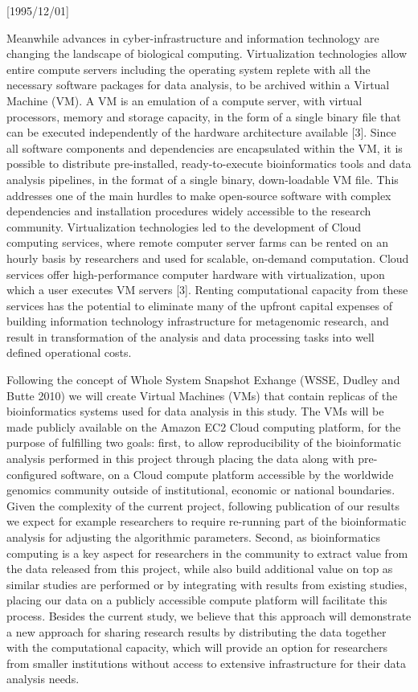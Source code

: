 \NeedsTeXFormat{LaTeX2e}[1995/12/01] \documentclass[10pt]{bmc_article}
\newenvironment{bmcformat}{\begin{raggedright}\baselineskip20pt\sloppy\setboolean{publ}{false}}{\end{raggedright}\baselineskip20pt\sloppy}
\begin{document}
\begin{bmcformat}
Meanwhile advances in cyber-infrastructure and information technology are changing the landscape of biological
computing. Virtualization technologies allow entire compute servers including the operating system replete
with all the necessary software packages for data analysis, to be archived within a Virtual Machine (VM). A VM
is an emulation of a compute server, with virtual processors, memory and storage capacity, in the form of a
single binary file that can be executed independently of the hardware architecture available [3]. Since all
software components and dependencies are encapsulated within the VM, it is possible to distribute
pre-installed, ready-to-execute bioinformatics tools and data analysis pipelines, in the format of a single
binary, down-loadable VM file. This addresses one of the main hurdles to make open-source software with
complex dependencies and installation procedures widely accessible to the research community.  Virtualization
technologies led to the development of Cloud computing services, where remote computer server farms can be
rented on an hourly basis by researchers and used for scalable, on-demand computation. Cloud services offer
high-performance computer hardware with virtualization, upon which a user executes VM servers [3]. Renting
computational capacity from these services has the potential to eliminate many of the upfront capital expenses
of building information technology infrastructure for metagenomic research, and result in transformation of
the analysis and data processing tasks into well defined operational costs. 

Following the concept of Whole System Snapshot Exhange (WSSE, Dudley and Butte 2010) we will create Virtual
Machines (VMs) that contain replicas of the bioinformatics systems used for data analysis in this study. The
VMs will be made publicly available on the Amazon EC2 Cloud computing platform, for the purpose of fulfilling
two goals: first, to allow reproducibility of the bioinformatic analysis performed in this project through
placing the data along with pre-configured software, on a Cloud compute platform accessible by the worldwide
genomics community outside of institutional, economic or national boundaries. Given the complexity of  the
current project, following publication of our results we expect for example researchers to require re-running
part of the bioinformatic analysis for adjusting the algorithmic parameters. Second, as bioinformatics
computing is a key aspect for researchers in the community to extract value from the data released from this
project, while also build additional value on top as similar studies are performed or by integrating with
results from existing studies, placing our data on a publicly accessible compute platform will facilitate this
process. Besides the current study, we believe that this approach will demonstrate a new approach for sharing
research results by distributing  the data together with the computational capacity, which will provide an
option for researchers from smaller institutions without access to extensive infrastructure for their data
analysis needs.


\end{bmcformat}
\end{document}

